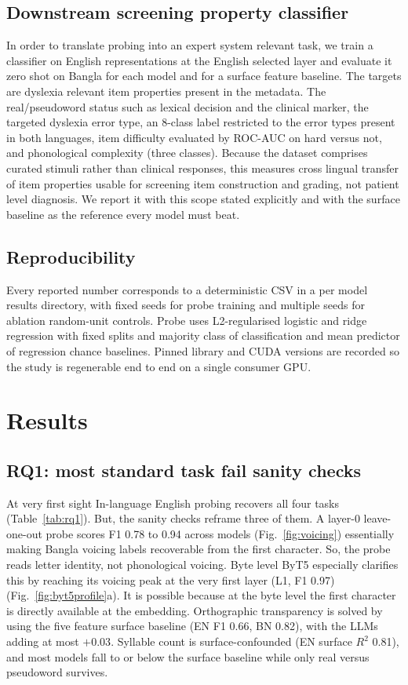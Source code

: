 \documentclass[preprint,12pt,authoryear]{elsarticle}
\begin{document}
\subsection{Downstream screening property classifier}
\label{sec:method-downstream}
In order to translate probing into an expert system relevant task, we train a classifier on English representations at the English selected layer and evaluate it zero shot on Bangla for each model and for a surface feature baseline. The targets are dyslexia relevant item properties present in the metadata. The real/pseudoword status such as lexical decision and the clinical marker, the targeted dyslexia error type, an 8-class label restricted to the error types present in both languages, item difficulty evaluated by ROC-AUC on hard versus not, and phonological complexity (three classes). Because the dataset comprises curated stimuli rather than clinical responses, this measures cross lingual transfer of item properties usable for screening item construction and grading, not patient level diagnosis. We report it with this scope stated explicitly and with the surface baseline as the reference every model must beat.

\subsection{Reproducibility}
Every reported number corresponds to a deterministic CSV in a per model results directory, with fixed seeds for probe training and multiple seeds for ablation random-unit controls. Probe uses L2-regularised logistic and ridge regression with fixed splits and majority class of classification and mean predictor of regression chance baselines. Pinned library and CUDA versions are recorded so the study is regenerable end to end on a single consumer GPU.

\section{Results}
\label{sec:results}

\subsection{RQ1: most standard task fail sanity checks}
At very first sight In-language English probing recovers all four tasks (Table~\ref{tab:rq1}). But, the sanity checks reframe three of them. A layer-0 leave-one-out probe scores F1 0.78 to 0.94 across models (Fig.~\ref{fig:voicing}) essentially making Bangla voicing labels recoverable from the first character. So, the probe reads letter identity, not phonological voicing. Byte level ByT5 especially clarifies this by reaching its voicing peak at the very first layer (L1, F1 0.97) (Fig.~\ref{fig:byt5profile}a). It is possible because at the byte level the first character is directly available at the embedding. Orthographic transparency is solved by using the five feature surface baseline (EN F1 0.66, BN 0.82), with the LLMs adding at most $+0.03$. Syllable count is surface-confounded (EN surface $R^2$ 0.81), and most models fall to or below the surface baseline while only real versus pseudoword survives.
\end{document}
